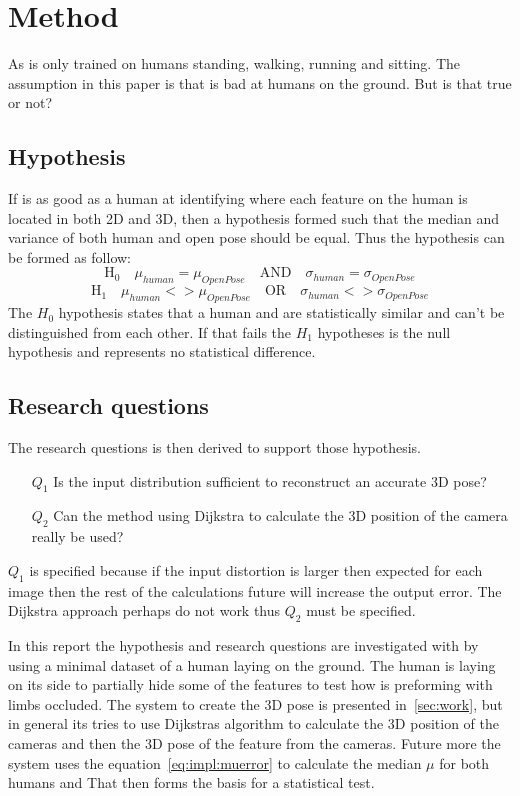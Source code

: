 \section{Method}
\label{sec:method}
As \openpose{ } is only trained on humans standing, walking, running and sitting.
The assumption in this paper is that \openpose{ } is bad at humans on the ground.
But is that true or not?
\subsection{Hypothesis}%
\label{sub:Hypothesis}

If \openpose{ } is as good as a human at identifying where each feature on the human is located in both 2D and 3D, then a hypothesis formed such that the median and variance of both human and open pose should be equal.
Thus the hypothesis can be formed as follow:
$$
\text{H}_0\quad \mu_{human} = \mu_{OpenPose} \quad\text{AND}\quad \sigma_{human} = \sigma_{OpenPose}
$$
$$
\text{H}_1\quad \mu_{human} <> \mu_{OpenPose} \quad\text{OR}\quad \sigma_{human} <> \sigma_{OpenPose}
$$
The $H_0$ hypothesis states that a human and \openpose{ } are statistically similar and can't be distinguished from each other.
If that fails the $H_1$ hypotheses is the null hypothesis and represents no statistical difference.

\subsection{Research questions}%
\label{sub:method:research_questions}
The research questions is then derived to support those hypothesis.
\begin{itemize}
    \item[$Q_1$] Is the input distribution sufficient to reconstruct an accurate 3D pose?
    \item[$Q_2$] Can the method using Dijkstra to calculate the 3D position of the camera really be used?
\end{itemize}
$Q_1$ is specified because if the input distortion is larger then expected for each image then the rest of the calculations future will increase the output error.
The Dijkstra approach perhaps do not work thus $Q_2$ must be specified.

In this report the hypothesis and research questions are investigated with by using a minimal dataset of a human laying on the ground.
The human is laying on its side to partially hide some of the features to test how \openpose is preforming with limbs occluded.
The system to create the 3D pose is presented in~\ref{sec:work}, but in general its tries to use Dijkstras algorithm to calculate the 3D position of the cameras and then the 3D pose of the feature from the cameras.
Future more the system uses the equation~\ref{eq:impl:muerror} to calculate the median $\mu$ for both humans and 
That then forms the basis for a statistical test.


